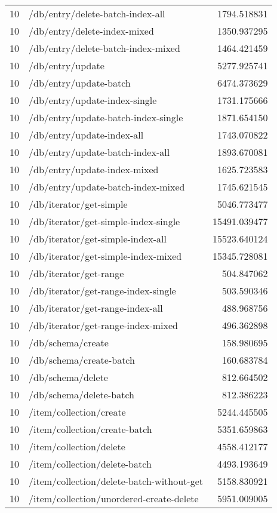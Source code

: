 \begin{longtable}{rlr}
10 & /db/entry/delete-batch-index-all & 1794.518831 \\
10 & /db/entry/delete-index-mixed & 1350.937295 \\
10 & /db/entry/delete-batch-index-mixed & 1464.421459 \\
10 & /db/entry/update & 5277.925741 \\
10 & /db/entry/update-batch & 6474.373629 \\
10 & /db/entry/update-index-single & 1731.175666 \\
10 & /db/entry/update-batch-index-single & 1871.654150 \\
10 & /db/entry/update-index-all & 1743.070822 \\
10 & /db/entry/update-batch-index-all & 1893.670081 \\
10 & /db/entry/update-index-mixed & 1625.723583 \\
10 & /db/entry/update-batch-index-mixed & 1745.621545 \\
10 & /db/iterator/get-simple & 5046.773477 \\
10 & /db/iterator/get-simple-index-single & 15491.039477 \\
10 & /db/iterator/get-simple-index-all & 15523.640124 \\
10 & /db/iterator/get-simple-index-mixed & 15345.728081 \\
10 & /db/iterator/get-range & 504.847062 \\
10 & /db/iterator/get-range-index-single & 503.590346 \\
10 & /db/iterator/get-range-index-all & 488.968756 \\
10 & /db/iterator/get-range-index-mixed & 496.362898 \\
10 & /db/schema/create & 158.980695 \\
10 & /db/schema/create-batch & 160.683784 \\
10 & /db/schema/delete & 812.664502 \\
10 & /db/schema/delete-batch & 812.386223 \\
10 & /item/collection/create & 5244.445505 \\
10 & /item/collection/create-batch & 5351.659863 \\
10 & /item/collection/delete & 4558.412177 \\
10 & /item/collection/delete-batch & 4493.193649 \\
10 & /item/collection/delete-batch-without-get & 5158.830921 \\
10 & /item/collection/unordered-create-delete & 5951.009005 \\

\end{longtable}
